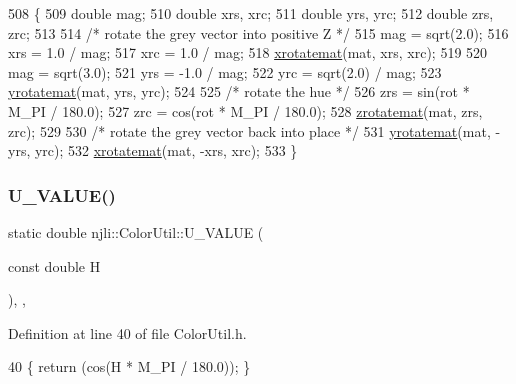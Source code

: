 \begin{DoxyCode}
508     \{
509       \textcolor{keywordtype}{double} mag;
510       \textcolor{keywordtype}{double} xrs, xrc;
511       \textcolor{keywordtype}{double} yrs, yrc;
512       \textcolor{keywordtype}{double} zrs, zrc;
513 
514       \textcolor{comment}{/* rotate the grey vector into positive Z */}
515       mag = sqrt(2.0);
516       xrs = 1.0 / mag;
517       xrc = 1.0 / mag;
518       \mbox{\hyperlink{classnjli_1_1_color_util_aa2f35809a653366ba6cfc11a34227af0}{xrotatemat}}(mat, xrs, xrc);
519 
520       mag = sqrt(3.0);
521       yrs = -1.0 / mag;
522       yrc = sqrt(2.0) / mag;
523       \mbox{\hyperlink{classnjli_1_1_color_util_ac37c7eb0af14d9171809c8a1cab9a834}{yrotatemat}}(mat, yrs, yrc);
524 
525       \textcolor{comment}{/* rotate the hue */}
526       zrs = sin(rot * M\_PI / 180.0);
527       zrc = cos(rot * M\_PI / 180.0);
528       \mbox{\hyperlink{classnjli_1_1_color_util_ab43ec520ddd37266b3fb9a2e4f4a4ec3}{zrotatemat}}(mat, zrs, zrc);
529 
530       \textcolor{comment}{/* rotate the grey vector back into place */}
531       \mbox{\hyperlink{classnjli_1_1_color_util_ac37c7eb0af14d9171809c8a1cab9a834}{yrotatemat}}(mat, -yrs, yrc);
532       \mbox{\hyperlink{classnjli_1_1_color_util_aa2f35809a653366ba6cfc11a34227af0}{xrotatemat}}(mat, -xrs, xrc);
533     \}
\end{DoxyCode}
\mbox{\label{classnjli_1_1_color_util_af8c30d8240cec7a999c78faf633f5672}} 
\subsubsection{\texorpdfstring{U\+\_\+\+V\+A\+L\+U\+E()}{U\_VALUE()}}
{\footnotesize\ttfamily static double njli\+::\+Color\+Util\+::\+U\+\_\+\+V\+A\+L\+UE (\begin{DoxyParamCaption}\item[{const double}]{H }\end{DoxyParamCaption})\hspace{0.3cm}{\ttfamily [inline]}, {\ttfamily [static]}, {\ttfamily [private]}}



Definition at line 40 of file Color\+Util.\+h.


\begin{DoxyCode}
40 \{ \textcolor{keywordflow}{return} (cos(H * M\_PI / 180.0)); \}
\end{DoxyCode}
\mbox{\label{classnjli_1_1_color_util_a683449ea8eec905409c9b746858cf14d}} 
